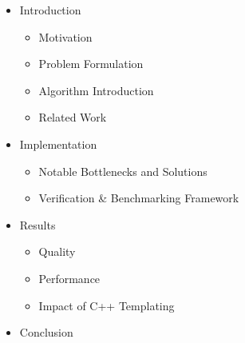 \begin{itemize}
    \item Introduction
    \begin{itemize}
        \item Motivation
        \item Problem Formulation
        \item Algorithm Introduction
        \item Related Work
    \end{itemize}
    \item Implementation
    \begin{itemize}
        \item Notable Bottlenecks and Solutions
        \item Verification \& Benchmarking Framework
    \end{itemize}
    \item Results
    \begin{itemize}
        \item Quality
        \item Performance
        \item Impact of C++ Templating
    \end{itemize}
    \item Conclusion
\end{itemize}
